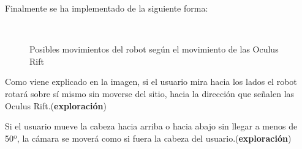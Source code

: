 \documentclass[twoside, 12pt]{epstfg}
\begin{document}
Finalmente se ha implementado de la siguiente forma:


\begin{figure}[h]
	\centering
	\\
	\caption{Posibles movimientos del robot según el movimiento de las Oculus Rift} \label{movRobot}
\end{figure}

Como viene explicado en la imagen, si el usuario mira hacia los lados el robot rotará sobre sí mismo sin moverse del sitio, hacia la dirección que señalen las Oculus Rift.(\textbf{exploración})

Si el usuario mueve la cabeza hacia arriba o hacia abajo sin llegar a menos de 50º, la cámara se moverá como si fuera la cabeza del usuario.(\textbf{exploración})
\end{document}
